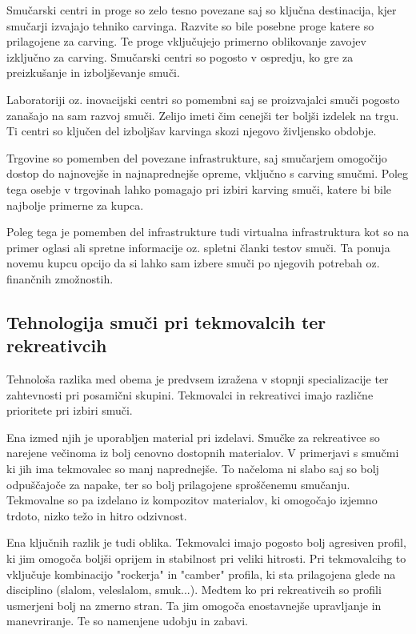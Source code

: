 \documentclass{article}
\begin{document}
Smučarski centri in proge so zelo tesno povezane saj so ključna destinacija, kjer smučarji izvajajo tehniko carvinga.
Razvite so bile posebne proge katere so prilagojene za carving. Te proge vključujejo primerno oblikovanje zavojev izključno za carving.
Smučarski centri so pogosto v ospredju, ko gre za preizkušanje in izboljševanje smuči.

Laboratoriji oz. inovacijski centri so pomembni saj se proizvajalci smuči pogosto zanašajo na sam razvoj smuči.
Zelijo imeti čim cenejši ter boljši izdelek na trgu. Ti centri so ključen del izboljšav karvinga skozi njegovo življensko obdobje.

Trgovine so pomemben del povezane infrastrukture, saj smučarjem omogočijo dostop do najnovejše in najnaprednejše opreme, vključno s carving smučmi. 
Poleg tega osebje v trgovinah lahko pomagajo pri izbiri karving smuči, katere bi bile najbolje primerne za kupca.

Poleg tega je pomemben del infrastrukture tudi virtualna infrastruktura kot so na primer oglasi ali spretne informacije oz. spletni članki testov smuči.
Ta ponuja novemu kupcu opcijo da si lahko sam izbere smuči po njegovih potrebah oz. finančnih zmožnostih.

\subsection*{Tehnologija smuči pri tekmovalcih ter rekreativcih}
Tehnološa razlika med obema je predvsem izražena v stopnji specializacije ter zahtevnosti pri posamični skupini.
Tekmovalci in rekreativci imajo različne prioritete pri izbiri smuči.

Ena izmed njih je uporabljen material pri izdelavi. Smučke za rekreativce so narejene večinoma iz bolj cenovno dostopnih materialov. 
V primerjavi s smučmi ki jih ima tekmovalec so manj naprednejše. To načeloma ni slabo saj so bolj odpuščajoče za napake, ter so bolj prilagojene sproščenemu smučanju.
Tekmovalne so pa izdelano iz kompozitov materialov, ki omogočajo izjemno trdoto, nizko težo in hitro odzivnost. 

Ena ključnih razlik je tudi oblika. Tekmovalci imajo pogosto bolj agresiven profil, ki jim omogoča boljši oprijem in stabilnost pri veliki hitrosti.
Pri tekmovalcihg to vključuje kombinacijo "rockerja" in "camber" profila, ki sta prilagojena glede na disciplino (slalom, veleslalom, smuk...).
Medtem ko pri rekreativcih so profili usmerjeni bolj na zmerno stran. Ta jim omogoča enostavnejše upravljanje in manevriranje. 
Te so namenjene udobju in zabavi.
\end{document}
